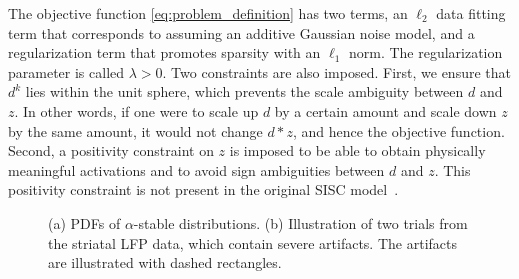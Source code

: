 The objective function \eqref{eq:problem_definition} has two terms, an $\ell_2$ data fitting term that corresponds to assuming an additive Gaussian noise model, and a regularization term that promotes sparsity with an $\ell_1$ norm.
The regularization parameter is called $\lambda > 0$. Two constraints are also imposed. First, we ensure that $d^{k}$ lies within the unit sphere, which prevents the scale ambiguity between $d$ and $z$. In other words, if one were to scale up $d$ by a certain amount and scale down $z$ by the same amount, it would not change $d * z$, and hence the objective function. Second, a positivity constraint on $z$ is imposed to be able to obtain physically meaningful activations and to avoid sign ambiguities between $d$ and $z$. This positivity constraint is not present in the original SISC model~\citep{lewicki1999coding, Grosse-etal:2007}.

\begin{figure}[t]
    \centering
     \hfill
    \caption[PDSFs of $\alpha$-stable distributions and trials containing artifacts.]{(a) PDFs of $\alpha$-stable distributions. (b) Illustration of two trials from the striatal LFP data, which contain severe artifacts. The artifacts are illustrated with dashed rectangles.}
    \label{fig:pdf_lfp}
\end{figure}




